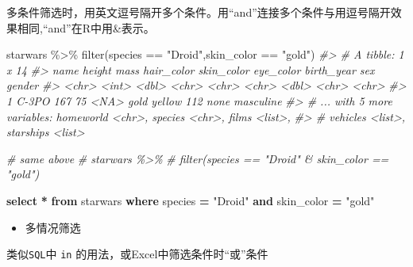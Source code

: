 \documentclass[
]{book}
\newenvironment{Shaded}{\begin{snugshade}}{\end{snugshade}}
\newcommand{\CommentTok}[1]{\textcolor[rgb]{0.56,0.35,0.01}{\textit{#1}}}
\newcommand{\FunctionTok}[1]{\textcolor[rgb]{0.00,0.00,0.00}{#1}}
\newcommand{\KeywordTok}[1]{\textcolor[rgb]{0.13,0.29,0.53}{\textbf{#1}}}
\newcommand{\NormalTok}[1]{#1}
\newcommand{\OperatorTok}[1]{\textcolor[rgb]{0.81,0.36,0.00}{\textbf{#1}}}
\newcommand{\OtherTok}[1]{\textcolor[rgb]{0.56,0.35,0.01}{#1}}
\newcommand{\SpecialCharTok}[1]{\textcolor[rgb]{0.00,0.00,0.00}{#1}}
\newcommand{\StringTok}[1]{\textcolor[rgb]{0.31,0.60,0.02}{#1}}
\providecommand{\tightlist}{%
  \setlength{\itemsep}{0pt}\setlength{\parskip}{0pt}}
\begin{document}
多条件筛选时，用英文逗号隔开多个条件。用``and''连接多个条件与用逗号隔开效果相同,``and''在R中用\&表示。

\begin{Shaded}
\begin{Highlighting}[]
\NormalTok{starwars }\SpecialCharTok{\%\textgreater{}\%} 
  \FunctionTok{filter}\NormalTok{(species }\SpecialCharTok{==} \StringTok{"Droid"}\NormalTok{,skin\_color }\SpecialCharTok{==} \StringTok{"gold"}\NormalTok{)}
\CommentTok{\#\textgreater{} \# A tibble: 1 x 14}
\CommentTok{\#\textgreater{}   name  height  mass hair\_color skin\_color eye\_color birth\_year sex   gender   }
\CommentTok{\#\textgreater{}   \textless{}chr\textgreater{}  \textless{}int\textgreater{} \textless{}dbl\textgreater{} \textless{}chr\textgreater{}      \textless{}chr\textgreater{}      \textless{}chr\textgreater{}          \textless{}dbl\textgreater{} \textless{}chr\textgreater{} \textless{}chr\textgreater{}    }
\CommentTok{\#\textgreater{} 1 C{-}3PO    167    75 \textless{}NA\textgreater{}       gold       yellow           112 none  masculine}
\CommentTok{\#\textgreater{} \# ... with 5 more variables: homeworld \textless{}chr\textgreater{}, species \textless{}chr\textgreater{}, films \textless{}list\textgreater{},}
\CommentTok{\#\textgreater{} \#   vehicles \textless{}list\textgreater{}, starships \textless{}list\textgreater{}}

\CommentTok{\# same above}
\CommentTok{\# starwars \%\textgreater{}\% }
\CommentTok{\#   filter(species == "Droid" \& skin\_color == "gold")}
\end{Highlighting}
\end{Shaded}

\begin{Shaded}
\begin{Highlighting}[]
\KeywordTok{select} \OperatorTok{*} \KeywordTok{from}\NormalTok{ starwars }\KeywordTok{where}\NormalTok{ species }\OperatorTok{=} \OtherTok{"Droid"} \KeywordTok{and}\NormalTok{ skin\_color }\OperatorTok{=} \OtherTok{"gold"} 
\end{Highlighting}
\end{Shaded}

\begin{itemize}
\tightlist
\item
  多情况筛选
\end{itemize}

类似\texttt{SQL}中 \texttt{in} 的用法，或Excel中筛选条件时``或''条件
\end{document}
